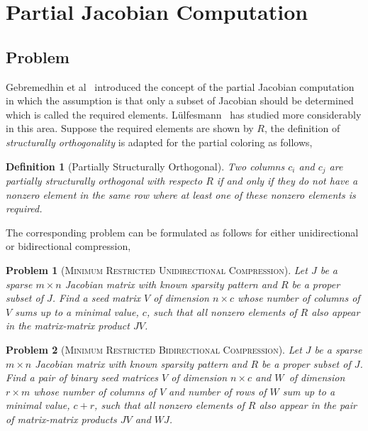 \documentclass[12pt, oneside]{book}
\newtheorem{problem}{Problem}
\newtheorem{definition}{Definition}
\newcommand{\col}{\ensuremath{c}}
\newcommand{\row}{\ensuremath{r}}
\newcommand{\MinStaBic}{\textsc{Minimum Star Bicoloring}}
\newcommand{\MinBidCom}{\textsc{Minimum Bidirectional Compression}}
\newcommand{\MinRUniCom}{\textsc{Minimum Restricted Unidirectional Compression}}
\newcommand{\MinRBidCom}{\textsc{Minimum Restricted Bidirectional Compression}}
\begin{document}

\section{Partial Jacobian Computation}
\label{s.part.jac}
\subsection{Problem}
Gebremedhin et al~\cite{Gebremedhin05whatcolor} introduced the concept of the partial Jacobian computation
in which the assumption is that only a subset of Jacobian should be determined which is called the required elements. 
L{\"u}lfesmann~\cite{Lulfesmann2012Fap} has studied more considerably in this area.
Suppose the required elements are shown by $R$, the definition of
\emph{structurally orthogonality} is adapted for the partial coloring as follows,
\begin{definition}[Partially Structurally Orthogonal]\label{d.part.str.orth}
Two columns $c_i$ and $c_j$ are partially structurally orthogonal with respecto $R$ 
if and only if they do not have a nonzero element in the same row where at least 
one of these nonzero elements is required.
\end{definition}

The corresponding problem can be formulated as follows for either unidirectional
or bidirectional compression,
\begin{problem}[\MinRUniCom]
\label{p.seed.uni} Let $J$ be a sparse ${m\times n}$ Jacobian matrix with known sparsity
pattern and $R$ be a proper subset of $J$. Find a seed matrix $V$ of dimension $n\times \col$ 
whose number of columns of $V$ sums up
to a minimal value, $\col$, such that all nonzero elements of $R$ also appear in
the matrix-matrix product $JV$.
\end{problem}

\begin{problem}[\MinRBidCom]
\label{p.seed.bid} Let $J$ be a sparse ${m\times n}$ Jacobian matrix with known sparsity
pattern and $R$ be a proper subset of $J$. 
Find a pair of binary seed matrices $V$ of dimension $n\times \col$ and $W$~of
dimension $\row \times m$ whose number of columns of $V$ and number of rows of $W$ sum up
to a minimal value, $\col + \row$, such that all nonzero elements of $R$ also appear in
the pair of matrix-matrix products $JV$ and $WJ$.
\end{problem}
\end{document}
